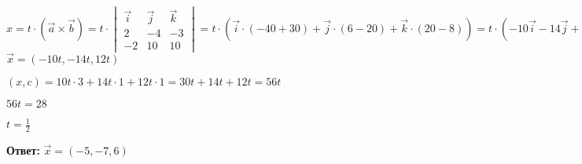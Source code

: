 $x = t \cdot (\vec a \times \vec b) =
t \cdot \begin{vmatrix}
            \vec i & \vec j & \vec k \\
            2 & -4 & -3 \\
            -2 & 10 & 10
        \end{vmatrix}
= t \cdot (\vec i \cdot (-40 + 30) + \vec j \cdot (6 - 20) + \vec k \cdot (20 - 8))
= t \cdot (-10 \vec i - 14 \vec j + 12 \vec k) $ \\

$\vec x = (-10t, -14t, 12t)$

$(x, c) = 10t \cdot 3 + 14t \cdot 1 + 12t \cdot 1 = 30t + 14t + 12t = 56t$

$56t = 28$

$t = \frac{1}{2}$

\textbf{Ответ:} $\vec x = (-5, -7, 6)$
